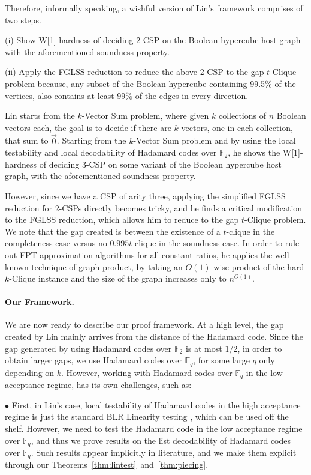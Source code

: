\documentclass[10pt,a4paper]{article}
\newcommand{\F}{\mathbb{F}}
\begin{document}
Therefore, informally speaking, a wishful version of Lin's framework comprises of two steps.

(i)  Show W[1]-hardness of deciding 2-CSP on the Boolean hypercube host graph with the aforementioned soundness property. 

(ii) Apply the FGLSS reduction to reduce the above 2-CSP to the gap $t$-Clique problem because, any subset of the Boolean hypercube containing 99.5\% of the vertices, also contains at least 99\% of the edges in every direction.

Lin starts from the $k$-Vector Sum problem, where given $k$ collections of $n$ Boolean vectors each, the goal is to decide if there are $k$ vectors, one in each collection, that sum to $\vec{0}$. 
Starting from  the $k$-Vector Sum problem and by using the local testability and local decodability of Hadamard codes over $\F_2$, he shows the  W[1]-hardness of deciding 3-CSP on some variant of the Boolean hypercube host graph, with the aforementioned soundness property. 

However, since we have a CSP of arity three, applying the simplified FGLSS reduction for 2-CSPs directly becomes tricky,  and he finds a critical modification to the FGLSS reduction, which allows him to reduce to the gap $t$-Clique problem. We note that the gap created is between the existence of  a $t$-clique in the completeness case versus no $0.995t$-clique in the soundness case. In order to rule out FPT-approximation algorithms for all constant ratios, he applies the well-known technique of   graph product, by taking an $O(1)$-wise product  of the hard $k$-Clique instance and the size of the graph increases only to $n^{O(1)}$.


\paragraph{Our Framework.} We are now ready to describe our proof framework. At a high level, the gap created by Lin mainly arrives from the distance of the Hadamard code. Since the gap generated by using Hadamard codes over $\F_2$ is at most $1/2$,  in order to obtain larger gaps, we use Hadamard codes over $\F_q$, for some large  $q$ only depending on $k$.  However, working with Hadamard codes over $\F_q$ in the low acceptance regime, has its own challenges, such as:

$\bullet$ First, in Lin's case, local testability of Hadamard codes in the high acceptance regime is just the standard BLR Linearity testing \cite{BLR93}, which can be used off the shelf. However, we need to test the Hadamard code in the low acceptance regime over $\F_q$, and thus we prove results on the list decodability of Hadamard codes over $\F_q$. Such results appear implicitly in literature, and we make them explicit through our Theorems~\ref{thm:lintest}~and~\ref{thm:piecing}. 
\end{document}
